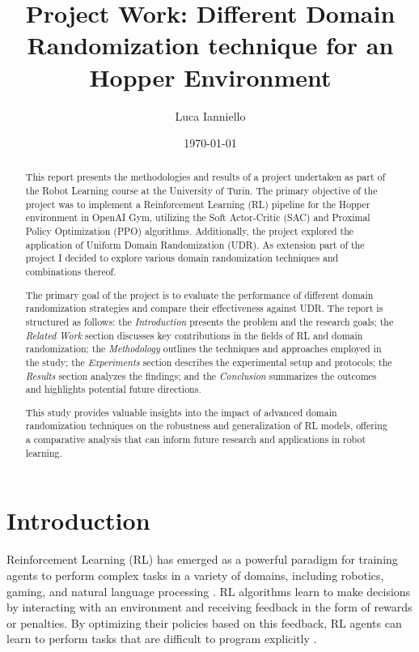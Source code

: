 \documentclass[12pt]{article}
\title{Project Work: Different Domain Randomization technique for an Hopper Environment}
\author{Luca Ianniello}
\date{\today}
\begin{document}
\maketitle

\begin{abstract}

    This report presents the methodologies and results of a project undertaken as part of the Robot Learning course at the University of Turin. The primary objective of the project was to implement a Reinforcement Learning (RL) pipeline for the Hopper environment in OpenAI Gym, utilizing the Soft Actor-Critic (SAC) and Proximal Policy Optimization (PPO) algorithms. Additionally, the project explored the application of Uniform Domain Randomization (UDR). As extension part of the project I decided to explore various domain randomization techniques and combinations thereof.

    The primary goal of the project is to evaluate the performance of different domain randomization strategies and compare their effectiveness against UDR. The report is structured as follows: the \textit{Introduction} presents the problem and the research goals; the \textit{Related Work} section discusses key contributions in the fields of RL and domain randomization; the \textit{Methodology} outlines the techniques and approaches employed in the study; the \textit{Experiments} section describes the experimental setup and protocols; the \textit{Results} section analyzes the findings; and the \textit{Conclusion} summarizes the outcomes and highlights potential future directions.
    
    This study provides valuable insights into the impact of advanced domain randomization techniques on the robustness and generalization of RL models, offering a comparative analysis that can inform future research and applications in robot learning.
    
\end{abstract}

\section{Introduction}

Reinforcement Learning (RL) has emerged as a powerful paradigm for training agents to perform complex tasks in a variety of domains, including robotics, gaming, and natural language processing \cite{Sutton2018}. RL algorithms learn to make decisions by interacting with an environment and receiving feedback in the form of rewards or penalties. By optimizing their policies based on this feedback, RL agents can learn to perform tasks that are difficult to program explicitly \cite{Kober2013}. 
\end{document}

